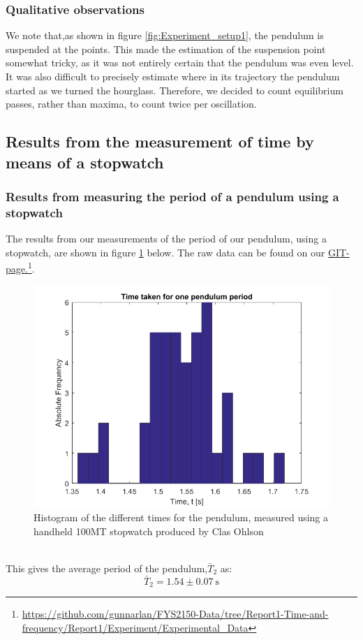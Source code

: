 \documentclass[a4paper, 10pt]{article}
\begin{document}
\subsubsection{Qualitative observations}
We note that,as shown in figure \ref{fig:Experiment_setup1}, the pendulum is suspended at the points. This made the estimation of the suspension point somewhat tricky, as it was not entirely certain that the pendulum was even level. It was also difficult to precisely estimate where in its trajectory the pendulum started as we turned the hourglass. Therefore, we decided to count equilibrium passes, rather than maxima, to count twice per oscillation. 
\subsection{Results from the measurement of time by means of a stopwatch}
\subsubsection{Results from measuring the period of a pendulum using a stopwatch}
The results from our measurements of the period of our pendulum, using a stopwatch, are shown in figure \ref{fig:Experiment_2} below. The raw data can be found on our \href{https://github.com/gunnarlan/FYS2150-Data/tree/Report1-Time-and-frequency/Report1/Experiment/Experimental_Data}{GIT-page.}\footnote{\url{https://github.com/gunnarlan/FYS2150-Data/tree/Report1-Time-and-frequency/Report1/Experiment/Experimental_Data}}.
\begin{figure}[ht!]
\centering
\includegraphics[scale=0.7]{Experiment2.png}
\caption{Histogram of the different times for the pendulum, measured using a handheld 100MT stopwatch produced by Clas Ohlson}\label{fig:Experiment_2}
\end{figure}\\
This gives the average period of the pendulum,$\bar{T}_2$ as:
$$\bar{T}_2=1.54  \pm 0.07 \ \mathrm{s}$$
\newpage
\end{document}
